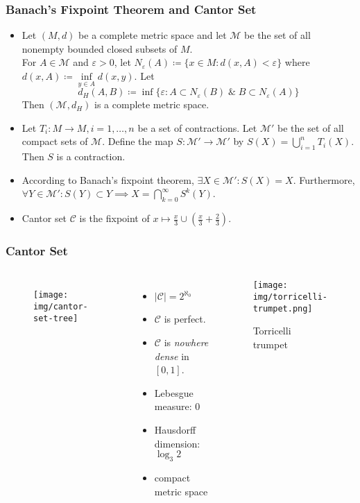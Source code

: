 \documentclass[UTF8,11pt,colorlinks,compress,openany]{beamer}%
\begin{document}
\begin{frame}\frametitle{Banach's Fixpoint Theorem and Cantor Set}
	\begin{itemize}
		\item Let $(M,d)$ be a complete metric space and let $\mathcal{M}$ be the set of all nonempty bounded closed subsets of $M$.\\
		For $A\in\mathcal{M}$ and $\varepsilon>0$, let $N_\varepsilon(A)\coloneqq \big\{x\in M: d(x,A)<\varepsilon\big\}$ where $d(x,A)\coloneqq \inf\limits_{y\in A}d(x,y)$. Let \[d_H(A,B)\coloneqq \inf\big\{\varepsilon: A\subset N_\varepsilon(B)\;\&\;B\subset N_\varepsilon(A)\big\}\]
		Then $(\mathcal{M},d_H)$ is a complete metric space.
		\item Let $T_i: M\to M, i=1,\dots,n$ be a set of contractions. Let $\mathcal{M}'$ be the set of all compact sets of $\mathcal{M}$. Define the map $S:\mathcal{M}'\to\mathcal{M}'$ by $S(X)=\bigcup\limits_{i=1}^n T_i(X)$.
		Then $S$ is a contraction.
		\item According to Banach's fixpoint theorem, $\exists X\in\mathcal{M}': S(X)=X$. Furthermore, $\forall Y\in\mathcal{M}': S(Y)\subset Y\implies X=\bigcap\limits_{k=0}^\infty S^k(Y)$.
		\item Cantor set $\mathcal{C}$ is the fixpoint of $x\mapsto\frac{x}{3}\cup\left(\frac{x}{3}+\frac{2}{3}\right)$.
	\end{itemize}
\end{frame}

\begin{frame}\frametitle{Cantor Set}\vspace{-2ex}
	\begin{columns}
			\begin{figure}
				\texttt{[image: img/cantor-set-tree]}
			\end{figure}
			\vspace{-12pt}
			\begin{itemize}
				\item $|\mathcal{C}|=2^{\aleph_0}$
				\item $\mathcal{C}$ is perfect.
				\item $\mathcal{C}$ is \emph{nowhere dense} in $[0,1]$.
				\item Lebesgue measure: $0$
				\item Hausdorff dimension: $\log_3 2$
				\item compact metric space
			\end{itemize}
			\begin{center}
				\begin{figure}
					\texttt{[image: img/torricelli-trumpet.png]}\vspace{-4ex}\caption{Torricelli trumpet}
				\end{figure}
			\end{center}
	\end{columns}
\end{frame}
\end{document}
